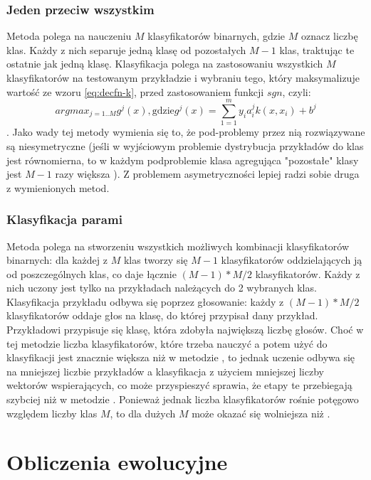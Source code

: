 \subsubsection{Jeden przeciw wszystkim}
Metoda  polega na nauczeniu $ M $ klasyfikatorów binarnych, gdzie $ M $ oznacz liczbę klas. Każdy z nich separuje jedną klasę od pozostałych $ M-1 $ klas, traktując te ostatnie jak jedną klasę. Klasyfikacja polega na zastosowaniu wszystkich $ M $ klasyfikatorów na testowanym przykładzie i wybraniu tego, który maksymalizuje wartość ze wzoru \ref{eq:decfn-k}, przed zastosowaniem funkcji $ sgn $, czyli:
$$ argmax_{j=1..M} g^j(x), \text{gdzie} g^j(x) = \sum_{1=1}^m y_ia_i^j k(x, x_i) + b^j $$.
Jako wady tej metody wymienia się to, że pod-problemy przez nią rozwiązywane są niesymetryczne (jeśli w wyjściowym problemie dystrybucja przykładów do klas jest równomierna, to w każdym podproblemie klasa agregująca "pozostałe" klasy jest $ M-1 $ razy większa ). Z problemem asymetryczności lepiej radzi sobie druga z wymienionych metod.

\subsubsection{Klasyfikacja parami}
Metoda  polega na stworzeniu wszystkich możliwych kombinacji klasyfikatorów binarnych: dla każdej z $ M $ klas tworzy się $ M-1 $ klasyfikatorów oddzielających ją od poszczególnych klas, co daje łącznie $ (M-1)*M/2 $ klasyfikatorów. Każdy z nich uczony jest tylko na przykładach należących do 2 wybranych klas. Klasyfikacja przykładu odbywa się poprzez głosowanie: każdy z $ (M-1)*M/2 $ klasyfikatorów oddaje głos na klasę, do której przypisał dany przykład. Przykładowi przypisuje się klasę, która zdobyła największą liczbę głosów.
Choć w tej metodzie liczba klasyfikatorów, które trzeba nauczyć a potem użyć do klasyfikacji jest znacznie większa niż w metodzie , to jednak uczenie odbywa się na mniejszej liczbie przykładów a klasyfikacja z użyciem mniejszej liczby wektorów wspierających, co może przyspieszyć sprawia, że etapy te przebiegają szybciej niż w metodzie . Ponieważ jednak liczba klasyfikatorów rośnie potęgowo względem liczby klas $ M $, to dla dużych $ M $  może okazać się wolniejsza niż .


\section{Obliczenia ewolucyjne}

